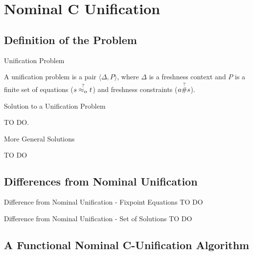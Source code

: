 \section{Nominal C Unification}
\subsection{Definition of the Problem}
\begin{frame}{Unification Problem}
    \begin{definition} 
        A unification problem is a pair $\langle \Delta, P \rangle$, where $\Delta$ is 
        a freshness context and $P$ is a finite set of equations ($s \overset{?}{\mathrel{\approx_\alpha}} t$) and freshness
        constraints ($a \overset{?}{\#} s$).
    \end{definition}
\end{frame}

\begin{frame}{Solution to a Unification Problem} 
    \begin{definition}
        TO DO.
    \end{definition}
\end{frame}

\begin{frame}{More General Solutions}
    \begin{definition}
        TO DO 
    \end{definition}
\end{frame}

\subsection{Differences from Nominal Unification}
\begin{frame}{Difference from Nominal Unification - Fixpoint Equations}
    TO DO
\end{frame}

\begin{frame}{Difference from Nominal Unification - Set of Solutions}
    TO DO
\end{frame}


\subsection{A Functional Nominal C-Unification Algorithm}

